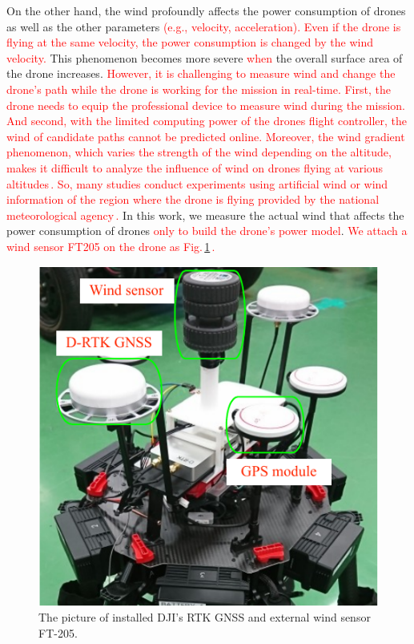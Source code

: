 \documentclass[journal]{./template/IEEEtran}
\begin{document}
On the other hand, the wind profoundly affects the power consumption of drones as well as the other parameters \textcolor{red}{(e.g., velocity, acceleration).}
\textcolor{red}{Even if the drone is flying at the same velocity, the power consumption is changed by the wind velocity.}
This phenomenon becomes more severe \textcolor{red}{when} the overall surface area of the drone increases.
\textcolor{red}{However, it is challenging to measure wind and change the drone's path while the drone is working for the mission in real-time. First, the drone needs to equip the professional device to measure wind during the mission. And second, with the limited computing power of the drones flight controller, the wind of candidate paths cannot be predicted online.
Moreover, the wind gradient phenomenon, which varies the strength of the wind depending on the altitude, makes it difficult to analyze the influence of wind on drones flying at various altitudes\,\cite{ref_28}.
So, many studies conduct experiments using artificial wind or wind information of the region where the drone is flying provided by the national meteorological agency\,\cite{ref_5,ref_9}.
}
In this work, we measure the actual wind that affects the power consumption of drones \textcolor{red}{only to build the drone's power model}.
\textcolor{red}{We attach a wind sensor FT205 on the drone as Fig.\,\ref{fig:wind_sensor}\,\cite{ref_15}.}

\begin{figure}[ht]
\centering\includegraphics[scale=0.90]{fig5/wind_sensor_resize.pdf}
\caption{The picture of installed DJI's RTK GNSS and external wind sensor FT-205.}
\label{fig:wind_sensor}
\end{figure}
\end{document}
